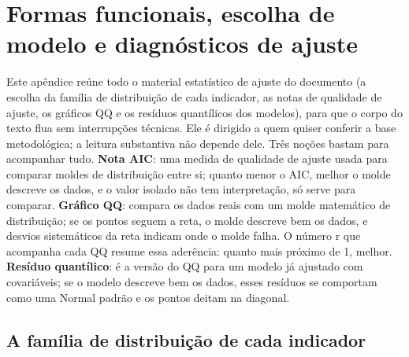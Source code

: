 \section{Formas funcionais, escolha de modelo e diagnósticos de ajuste}
\label{ap:diagnosticos}

\setcounter{figure}{0}
\renewcommand{\thefigure}{\thesection.\arabic{figure}}
\setcounter{table}{0}
\renewcommand{\thetable}{\thesection.\arabic{table}}

Este apêndice reúne todo o material estatístico de ajuste do documento
(a escolha da família de distribuição de cada indicador, as notas de
qualidade de ajuste, os gráficos QQ e os resíduos quantílicos dos
modelos), para que o corpo do texto flua sem interrupções técnicas.
Ele é dirigido a quem quiser conferir a base metodológica; a leitura
substantiva não depende dele. Três noções bastam para acompanhar tudo.
\textbf{Nota AIC}: uma medida de qualidade de ajuste usada para comparar
moldes de distribuição entre si; quanto menor o AIC, melhor o molde
descreve os dados, e o valor isolado não tem interpretação, só serve
para comparar. \textbf{Gráfico QQ}: compara os dados reais com um molde
matemático de distribuição; se os pontos seguem a reta, o molde descreve
bem os dados, e desvios sistemáticos da reta indicam onde o molde falha.
O número r que acompanha cada QQ resume essa aderência: quanto mais
próximo de 1, melhor. \textbf{Resíduo quantílico}: é a versão do QQ
para um modelo já ajustado com covariáveis; se o modelo descreve bem
os dados, esses resíduos se comportam como uma Normal padrão e os
pontos deitam na diagonal.

\subsection*{A família de distribuição de cada indicador}

